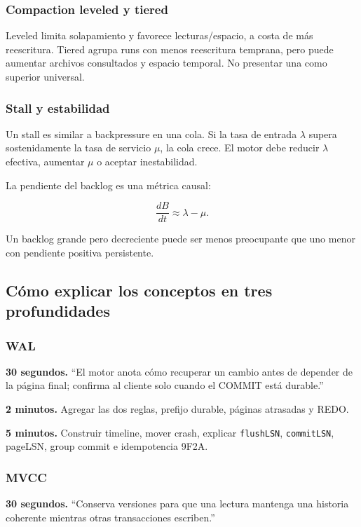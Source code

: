 \documentclass[variant=docente,cover=institutional,mode=screen]{ua-engineering-v6-article}
\begin{document}
\subsubsection*{Compaction leveled y tiered}

Leveled limita solapamiento y favorece lecturas/espacio, a costa de más reescritura. Tiered agrupa runs con menos reescritura temprana, pero puede aumentar archivos consultados y espacio temporal. No presentar una como superior universal.

\subsubsection*{Stall y estabilidad}

Un stall es similar a backpressure en una cola. Si la tasa de entrada $\lambda$ supera sostenidamente la tasa de servicio $\mu$, la cola crece. El motor debe reducir $\lambda$ efectiva, aumentar $\mu$ o aceptar inestabilidad.

La pendiente del backlog es una métrica causal:

\[
\frac{dB}{dt} \approx \lambda - \mu.
\]

Un backlog grande pero decreciente puede ser menos preocupante que uno menor con pendiente positiva persistente.

\subsection{Cómo explicar los conceptos en tres profundidades}

\subsubsection*{WAL}

\textbf{30 segundos.} ``El motor anota cómo recuperar un cambio antes de depender de la página final; confirma al cliente solo cuando el COMMIT está durable.''

\textbf{2 minutos.} Agregar las dos reglas, prefijo durable, páginas atrasadas y REDO.

\textbf{5 minutos.} Construir timeline, mover crash, explicar \texttt{flushLSN}, \texttt{commitLSN}, pageLSN, group commit e idempotencia 9F2A.

\subsubsection*{MVCC}

\textbf{30 segundos.} ``Conserva versiones para que una lectura mantenga una historia coherente mientras otras transacciones escriben.''
\end{document}
